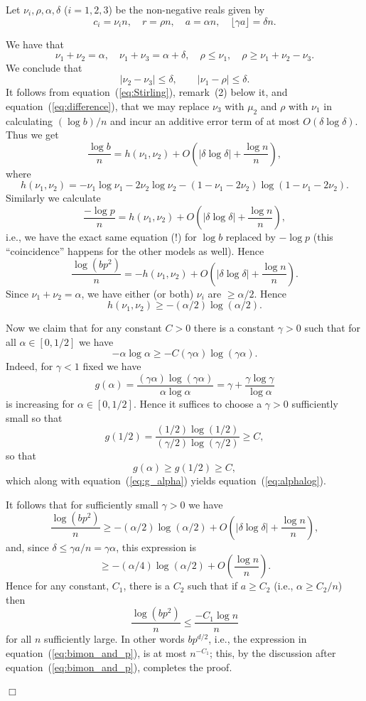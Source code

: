 \documentclass[12pt]{article}
\newcommand{\proofbox}{\begin{flushright}$\Box$\end{flushright}}
\begin{document}
Let $\nu_i,\rho,\alpha,\delta$ ($i=1,2,3$) be the non-negative reals given by
$$
c_i=\nu_i n,\quad r=\rho n,\quad a=\alpha n,\quad \lfloor \gamma a\rfloor
=\delta n.
$$

We have that
$$
\nu_1+\nu_2=\alpha,\quad \nu_1+\nu_3=\alpha+\delta,
\quad \rho\le\nu_1,\quad \rho\ge \nu_1+\nu_2-\nu_3.
$$
We conclude that
$$
|\nu_2-\nu_3| \le \delta,\qquad |\nu_1-\rho|\le \delta.
$$
It follows 
from equation~(\ref{eq:Stirling}), remark~(2) below it, and
equation~(\ref{eq:difference}),
that we may replace $\nu_3$ with $\mu_2$ and $\rho$ with
$\nu_1$ in calculating $(\log b)/n$ and incur an additive error term
of at most $O(\delta\log\delta)$.  Thus we get
$$
\frac{\log b}{n} = h(\nu_1,\nu_2)+
O\left(|\delta\log\delta|+\frac{\log n}{n}\right),
$$
where
\begin{equation}\label{eq:ubiqu_h}
h(\nu_1,\nu_2) = -\nu_1\log\nu_1-2\nu_2\log\nu_2
-(1-\nu_1-2\nu_2)
\log(1-\nu_1-2\nu_2).
\end{equation}
Similarly we calculate
$$
\frac{-\log p}{n} = h(\nu_1,\nu_2)+
O\left(|\delta\log\delta|+\frac{\log n}{n}\right),
$$
i.e., we have
the exact same equation (!)
for $\log b$ replaced by $-\log p$
(this ``coincidence'' happens for the other models as well).
Hence
$$
\frac{\log(bp^2)}{n} = -h(\nu_1,\nu_2)
+ O\left(|\delta\log\delta|+\frac{\log n}{n}\right).
$$
Since $\nu_1+\nu_2=\alpha$, we have either (or both) $\nu_i$ are
$\ge \alpha/2$.  Hence
$$
h(\nu_1,\nu_2) \ge -(\alpha/2)\log(\alpha/2).
$$

Now we claim that for any constant $C>0$ there is a constant $\gamma>0$
such that for all $\alpha\in[0,1/2]$ we have
\begin{equation}\label{eq:alphalog}
-\alpha\log\alpha \ge -C (\gamma\alpha)\log(\gamma\alpha).
\end{equation}
Indeed, for $\gamma<1$ fixed we have
\begin{equation}\label{eq:g_alpha}
g(\alpha) = \frac{(\gamma\alpha)\log(\gamma\alpha)}{\alpha\log\alpha}
=\gamma+\frac{\gamma\log\gamma}{\log\alpha}
\end{equation}
is increasing for $\alpha\in[0,1/2]$.  Hence it suffices to choose a
$\gamma>0$ sufficiently small so that
$$
g(1/2)=\frac{(1/2)\log(1/2)}{(\gamma/2)\log(\gamma/2)} \ge C,
$$
so that
$$
g(\alpha)\ge g(1/2)\ge C,
$$
which along with equation~(\ref{eq:g_alpha}) yields 
equation~(\ref{eq:alphalog}).

It follows that for sufficiently small $\gamma>0$ we have
$$
\frac{\log(bp^2)}{n} \ge -(\alpha/2)\log(\alpha/2) + 
O\left(|\delta\log\delta|+\frac{\log n}{n}\right),
$$
and, since $\delta\le\gamma a/n=\gamma\alpha$, this expression is
$$
\ge -(\alpha/4)\log(\alpha/2) + 
O\left(\frac{\log n}{n}\right).
$$
Hence for any constant, $C_1$, there is a $C_2$ such that if $a\ge C_2$
(i.e., $\alpha\ge C_2/n$) then 
$$
\frac{\log(bp^2)}{n} \le \frac{-C_1\log n}{n}
$$
for all $n$ sufficiently large.  In other words $bp^{d/2}$,
i.e., the expression in equation~(\ref{eq:bimon_and_p}),
is at most $n^{-C_1}$; this, by the discussion after
equation~(\ref{eq:bimon_and_p}),
completes the proof.
\proofbox
\end{document}
